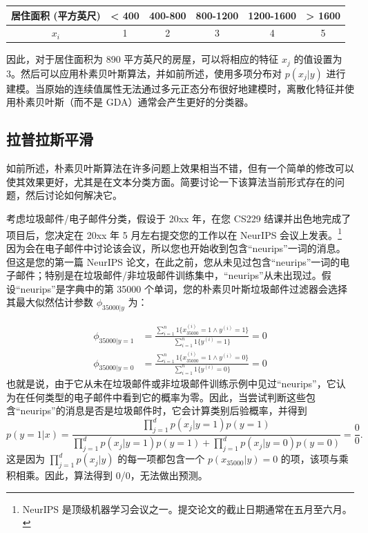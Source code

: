 \begin{table}[H]
    \centering
    \begin{tabular}{c|c|c|c|c|c}
        居住面积 (平方英尺) & < 400 & 400-800 & 800-1200 & 1200-1600 & > 1600 \\
        \hline
        $x_i$ & 1 & 2 & 3 & 4 & 5 
    \end{tabular}
\end{table}

因此，对于居住面积为 890 平方英尺的房屋，可以将相应的特征 $x_j$ 的值设置为 3。然后可以应用朴素贝叶斯算法，并如前所述，使用多项分布对 $p(x_j|y)$ 进行建模。当原始的连续值属性无法通过多元正态分布很好地建模时，离散化特征并使用朴素贝叶斯（而不是 GDA）通常会产生更好的分类器。

\subsection{拉普拉斯平滑}

如前所述，朴素贝叶斯算法在许多问题上效果相当不错，但有一个简单的修改可以使其效果更好，尤其是在文本分类方面。简要讨论一下该算法当前形式存在的问题，然后讨论如何解决它。

考虑垃圾邮件/电子邮件分类，假设于 20xx 年，在您 CS229 结课并出色地完成了项目后，您决定在 20xx 年 5 月左右提交您的工作以在 NeurIPS 会议上发表。\footnote{NeurIPS 是顶级机器学习会议之一。提交论文的截止日期通常在五月至六月。} 因为会在电子邮件中讨论该会议，所以您也开始收到包含“neurips”一词的消息。但这是您的第一篇 NeurIPS 论文，在此之前，您从未见过包含“neurips”一词的电子邮件；特别是在垃圾邮件/非垃圾邮件训练集中，“neurips”从未出现过。假设“neurips”是字典中的第 35000 个单词，您的朴素贝叶斯垃圾邮件过滤器会选择其最大似然估计参数 $\phi_{35000|y}$ 为：

\begin{align*} 
\phi_{35000|y=1} &= \frac{\sum_{i=1}^n {1}\{x_{35000}^{(i)} = 1 \wedge y^{(i)} = 1\}}{\sum_{i=1}^n {1}\{y^{(i)} = 1\}} = 0 \\ \phi_{35000|y=0} &= \frac{\sum_{i=1}^n {1}\{x_{35000}^{(i)} = 1 \wedge y^{(i)} = 0\}}{\sum_{i=1}^n {1}\{y^{(i)} = 0\}} = 0 
\end{align*}
也就是说，由于它从未在垃圾邮件或非垃圾邮件训练示例中见过“neurips”，它认为在任何类型的电子邮件中看到它的概率为零。因此，当尝试判断这些包含“neurips”的消息是否是垃圾邮件时，它会计算类别后验概率，并得到
\[
    p(y=1|x) = \frac{\prod_{j=1}^d p(x_j|y=1) p(y=1)}{\prod_{j=1}^d p(x_j|y=1) p(y=1) + \prod_{j=1}^d p(x_j|y=0) p(y=0)} = \frac{0}{0}.
\]
这是因为 $\prod_{j=1}^d p(x_j|y)$ 的每一项都包含一个 $p(x_{35000}|y) = 0$ 的项，该项与乘积相乘。因此，算法得到 0/0，无法做出预测。

